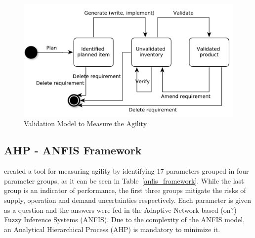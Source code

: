 \begin{figure} [H]
\centerline{\includegraphics[scale=0.6]{include/relatedwork/fig/validation_model.pdf}}
\caption{Validation Model to Measure the Agility} 
\label{validation_model}
\end{figure}

\subsection{AHP - ANFIS Framework} %
\citet{poonacha} created a tool for measuring agility by identifying 17 parameters grouped in four parameter groups, as it can be seen in Table~\ref{anfis_framework}. While the last group is an indicator of performance, the first three groups mitigate the risks of supply, operation and demand uncertainties respectively. Each parameter is given as a question and the answers were fed in the Adaptive Network based (on?) Fuzzy Inference Systems (ANFIS). Due to the complexity of the ANFIS model, an Analytical Hierarchical Process (AHP) is mandatory to minimize it.

